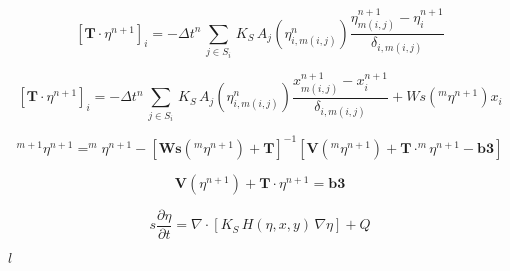 \documentclass{article}
\begin{document}
\[ \left[ \mathbf{T} \cdot \eta^{n+1} \right]_{i}= -\Delta t^{n} \, \sum_{j \in S_i} \, K_S \, A_j(\eta^n_{i,m(i,j)})\frac{\eta_{m(i,j)}^{n+1}-\eta_{i}^{n+1}}{\delta_{i,m(i,j)}} \]
\pagebreak

\[ \left[ \mathbf{T} \cdot \eta^{n+1} \right]_{i}= -\Delta t^{n} \, \sum_{j \in S_i} \, K_S \, A_j(\eta^n_{i,m(i,j)})\frac{x_{m(i,j)}^{n+1}-x_{i}^{n+1}}{\delta_{i,m(i,j)}}+ Ws(^m\eta^{n+1})x_i \]
\pagebreak

\[ ^{m+1}\eta^{n+1}= ^{m}\eta^{n+1}-\left[\mathbf{Ws}( ^{m}\eta^{n+1})+\mathbf{T}\right]^{-1}\left[\mathbf{V}( ^{m}\eta^{n+1})+\mathbf{T}\cdot^{m}\eta^{n+1} -\mathbf{b3}\right] \]
\pagebreak

\[ \mathbf{V}(\eta^{n+1})+\mathbf{T} \cdot \eta^{n+1} = \mathbf{b3} \]
\pagebreak

\[ s\frac {\partial \eta} {\partial t} = \nabla \cdot \left[ K_S \, H (\eta,x,y) \, \nabla \eta \right]+Q \]
\pagebreak

$l$
\pagebreak
\end{document}

